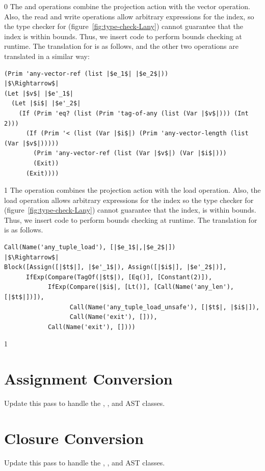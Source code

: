\documentclass[7x10]{TimesAPriori_MIT}%
\def\racketEd{0}
\def\pythonEd{1}
\def\edition{1}
\newcommand{\pythonColor}[0]{}
\numberwithin{theorem}{chapter}
\numberwithin{definition}{chapter}
\numberwithin{equation}{chapter}
\begin{document}
{\if\edition\racketEd    
The  and  operations
combine the projection action with the vector operation.  Also, the
read and write operations allow arbitrary expressions for the index, so
the type checker for \LangAny{} (figure~\ref{fig:type-check-Lany})
cannot guarantee that the index is within bounds. Thus, we insert code
to perform bounds checking at runtime. The translation for
 is as follows, and the other two operations are
translated in a similar way:
\begin{center}
\begin{minipage}{0.95\textwidth}
\begin{lstlisting}
(Prim 'any-vector-ref (list |$e_1$| |$e_2$|))
|$\Rightarrow$|
(Let |$v$| |$e'_1$|
  (Let |$i$| |$e'_2$|
    (If (Prim 'eq? (list (Prim 'tag-of-any (list (Var |$v$|))) (Int 2)))
      (If (Prim '< (list (Var |$i$|) (Prim 'any-vector-length (list (Var |$v$|)))))
        (Prim 'any-vector-ref (list (Var |$v$|) (Var |$i$|)))
        (Exit))
      (Exit))))
\end{lstlisting}
\end{minipage}
\end{center}
\fi}
%
{\if\edition\pythonEd\pythonColor
%
The  operation combines the projection action
with the load operation.  Also, the load operation allows arbitrary
expressions for the index so the type checker for \LangAny{}
(figure~\ref{fig:type-check-Lany}) cannot guarantee that the index, is
within bounds. Thus, we insert code to perform bounds checking at
runtime. The translation for  is as follows.

\begin{lstlisting}
Call(Name('any_tuple_load'), [|$e_1$|,|$e_2$|])
|$\Rightarrow$|
Block([Assign([|$t$|], |$e'_1$|), Assign([|$i$|], |$e'_2$|)],
      IfExp(Compare(TagOf(|$t$|), [Eq()], [Constant(2)]),
            IfExp(Compare(|$i$|, [Lt()], [Call(Name('any_len'), [|$t$|])]),
                  Call(Name('any_tuple_load_unsafe'), [|$t$|, |$i$|]),
                  Call(Name('exit'), [])),
            Call(Name('exit'), [])))
\end{lstlisting}
\fi}


{\if\edition\pythonEd\pythonColor

\section{Assignment Conversion}
\label{sec:convert-assignments-Lany}

Update this pass to handle the , , and
 AST classes.

\section{Closure Conversion}
\label{sec:closure-conversion-Lany}

Update this pass to handle the , , and
 AST classes.

\fi}
\end{document}
